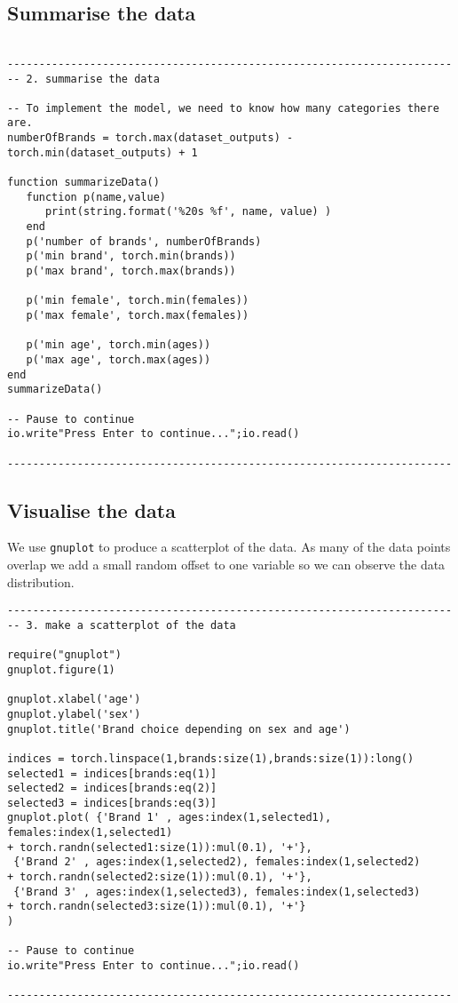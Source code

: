\subsection*{Summarise the data}

\begin{verbatim}

----------------------------------------------------------------------
-- 2. summarise the data

-- To implement the model, we need to know how many categories there are.
numberOfBrands = torch.max(dataset_outputs) - torch.min(dataset_outputs) + 1

function summarizeData()
   function p(name,value) 
      print(string.format('%20s %f', name, value) )
   end
   p('number of brands', numberOfBrands)
   p('min brand', torch.min(brands))
   p('max brand', torch.max(brands))
   
   p('min female', torch.min(females))
   p('max female', torch.max(females))
   
   p('min age', torch.min(ages))
   p('max age', torch.max(ages))
end
summarizeData()

-- Pause to continue
io.write"Press Enter to continue...";io.read()

----------------------------------------------------------------------
\end{verbatim}

\subsection*{Visualise the data}

We use {\tt gnuplot} to produce a
scatterplot of the data. As many of the data points overlap we
add a small random offset to one variable so we can observe the
data distribution.

\begin{verbatim}
----------------------------------------------------------------------
-- 3. make a scatterplot of the data

require("gnuplot")
gnuplot.figure(1)

gnuplot.xlabel('age')
gnuplot.ylabel('sex')
gnuplot.title('Brand choice depending on sex and age')

indices = torch.linspace(1,brands:size(1),brands:size(1)):long()
selected1 = indices[brands:eq(1)]
selected2 = indices[brands:eq(2)]
selected3 = indices[brands:eq(3)]
gnuplot.plot( {'Brand 1' , ages:index(1,selected1), females:index(1,selected1)
+ torch.randn(selected1:size(1)):mul(0.1), '+'}, 
 {'Brand 2' , ages:index(1,selected2), females:index(1,selected2)
+ torch.randn(selected2:size(1)):mul(0.1), '+'}, 
 {'Brand 3' , ages:index(1,selected3), females:index(1,selected3)
+ torch.randn(selected3:size(1)):mul(0.1), '+'} 
)

-- Pause to continue
io.write"Press Enter to continue...";io.read()

----------------------------------------------------------------------
\end{verbatim}

